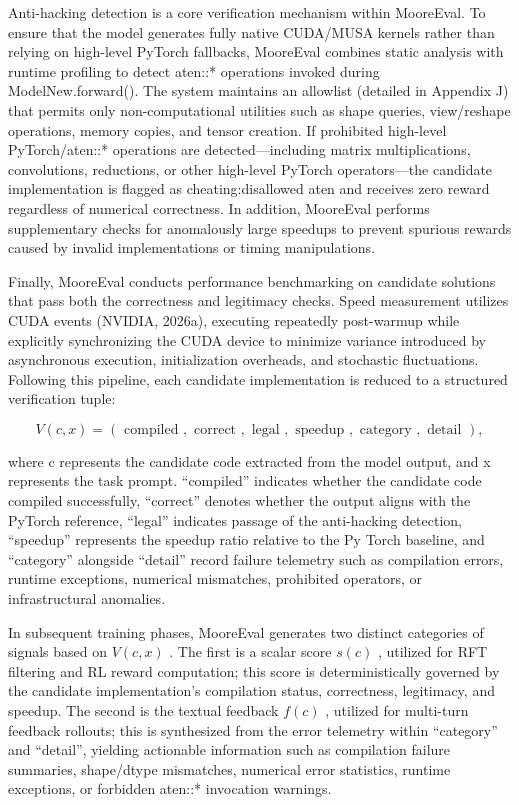 \documentclass[
  10
]{article}
\begin{document}
Anti-hacking detection is a core verification mechanism within
MooreEval. To ensure that the model generates fully native CUDA/MUSA
kernels rather than relying on high-level PyTorch fallbacks, MooreEval
combines static analysis with runtime profiling to detect aten::*
operations invoked during ModelNew.forward(). The system maintains an
allowlist (detailed in Appendix J) that permits only non-computational
utilities such as shape queries, view/reshape operations, memory copies,
and tensor creation. If prohibited high-level PyTorch/aten::* operations
are detected---including matrix multiplications, convolutions,
reductions, or other high-level PyTorch operators---the candidate
implementation is flagged as cheating:disallowed aten and receives zero
reward regardless of numerical correctness. In addition, MooreEval
performs supplementary checks for anomalously large speedups to prevent
spurious rewards caused by invalid implementations or timing
manipulations.

Finally, MooreEval conducts performance benchmarking on candidate
solutions that pass both the correctness and legitimacy checks. Speed
measurement utilizes CUDA events (NVIDIA, 2026a), executing repeatedly
post-warmup while explicitly synchronizing the CUDA device to minimize
variance introduced by asynchronous execution, initialization overheads,
and stochastic fluctuations. Following this pipeline, each candidate
implementation is reduced to a structured verification tuple:

\[
V (c, x) = (\text { compiled }, \text { correct }, \text { legal }, \text { speedup }, \text { category }, \text { detail }),\tag{1}
\]

where c represents the candidate code extracted from the model output,
and x represents the task prompt. ``compiled'' indicates whether the
candidate code compiled successfully, ``correct'' denotes whether the
output aligns with the PyTorch reference, ``legal'' indicates passage of
the anti-hacking detection, ``speedup'' represents the speedup ratio
relative to the \(\mathrm { P y }\) Torch baseline, and ``category''
alongside ``detail'' record failure telemetry such as compilation
errors, runtime exceptions, numerical mismatches, prohibited operators,
or infrastructural anomalies.

In subsequent training phases, MooreEval generates two distinct
categories of signals based on \(V ( c , x )\) . The first is a scalar
score \(s ( c )\) , utilized for RFT filtering and RL reward
computation; this score is deterministically governed by the candidate
implementation's compilation status, correctness, legitimacy, and
speedup. The second is the textual feedback \(f ( c )\) , utilized for
multi-turn feedback rollouts; this is synthesized from the error
telemetry within ``category'' and ``detail'', yielding actionable
information such as compilation failure summaries, shape/dtype
mismatches, numerical error statistics, runtime exceptions, or forbidden
aten::* invocation warnings.
\end{document}
